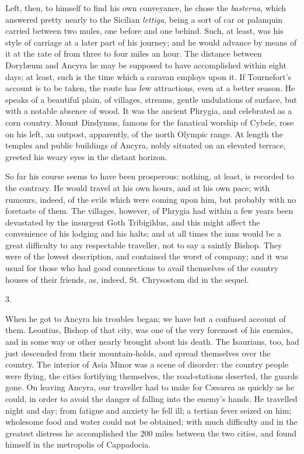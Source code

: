 Left, then, to himself to find his own conveyance, he chose the \emph{basterna},
which answered pretty nearly to the Sicilian \emph{lettiga}, being a
sort of car or palanquin carried between two mules, one before and one
behind. Such, at least, was his style of carriage at a later part of
his journey; and he would advance by means of it at the rate of from
three to four miles an hour. The distance between Dorylæum and Ancyra
he may be supposed to have accomplished within eight days; at least,
such is the time which a caravan employs upon it. If Tournefort's
account is to be taken, the route has few attractions, even at a
better season. He speaks of a beautiful plain, of villages, streams,
gentle undulations of surface, but with a notable absence of wood. It
was the ancient Phrygia, and celebrated as a corn country. Mount
Dindymus, famous for the fanatical worship of Cybele, rose on his
left, an outpost, apparently, of the north Olympic range. At length
the temples and public buildings of Ancyra, nobly situated on an
elevated terrace, greeted his weary eyes in the distant horizon.

So far his course seems to have been prosperous; nothing, at least,
is recorded to the contrary. He would travel at his own hours, and at
his own pace; with rumours, indeed, of the evils which were coming
upon him, but probably with no foretaste of them. The villages,
however, of Phrygia had within a few years been devastated by the
insurgent Goth Tribigildus, and this might affect the convenience of
his lodging and his halts; and at all times the inns would be a great
difficulty to any respectable traveller, not to say a saintly Bishop.
They were of the lowest description, and contained the worst of
company; and it was usual for those who had good connections to avail
themselves of the country houses of their friends, as, indeed, St.
Chrysostom did in the sequel.

3.

When he got to Ancyra his troubles began; we have but a confused
account of them. Leontius, Bishop of that city, was one of the very
foremost of his enemies, and in some way or other nearly brought about
his death. The Isaurians, too, had just descended from their
mountain-holds, and spread themselves over the country. The interior
of Asia Minor was a scene of disorder: the country people were flying,
the cities fortifying themselves, the road-stations deserted,
the guards gone. On leaving Ancyra, our traveller had to make for
Cæsarea as quickly as he could, in order to avoid the danger of
falling into the enemy's hands. He travelled night and day; from
fatigue and anxiety he fell ill; a tertian fever seized on him;
wholesome food and water could not be obtained; with much difficulty
and in the greatest distress he accomplished the 200 miles between the
two cities, and found himself in the metropolis of Cappadocia.

